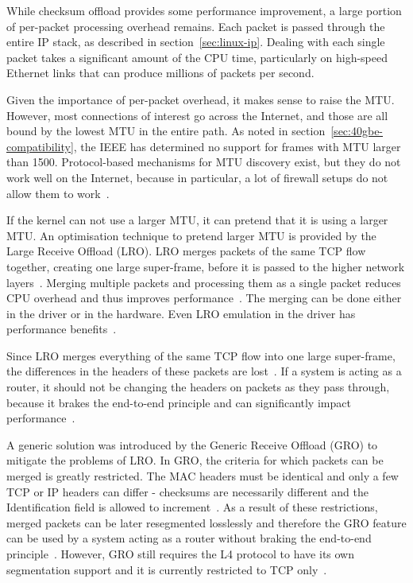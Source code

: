 While checksum offload provides some performance improvement,
a large portion of per-packet processing overhead remains.
Each packet is passed through the entire IP stack, as described in section~\ref{sec:linux-ip}.
Dealing with each single packet takes a significant amount of the CPU time, particularly on high-speed Ethernet links that
can produce millions of packets per second.

Given the importance of per-packet overhead, it makes sense to raise the MTU.
However, most connections of interest go across the Internet,
and those are all bound by the lowest MTU in the entire path.
As noted in section~\ref{sec:40gbe-compatibility}, the IEEE has determined no support for frames with MTU larger than 1500.
Protocol-based mechanisms for MTU discovery exist, but they do not work well on the Internet,
because in particular, a lot of firewall setups do not allow them to work~\cite{jls2009-gro}.

If the kernel can not use a larger MTU, it can pretend that it is using a larger MTU.
An optimisation technique to pretend larger MTU is provided by the Large Receive Offload (LRO).
LRO merges packets of the same TCP flow together,
creating one large super-frame, before it is passed to the higher network layers~\cite{jls2009-gro}.
Merging multiple packets and processing them as a single packet
reduces CPU overhead and thus improves performance~\cite{linux-kernel-networking}.
The merging can be done either in the driver or in the hardware.
Even LRO emulation in the driver has performance benefits~\cite{jls2009-gro}.

Since LRO merges everything of the same TCP flow into one large super-frame,
the differences in the headers of these packets are lost~\cite{jls2009-gro}.
If a system is acting as a router, it should not be changing the headers on packets as they pass through,
because it brakes the end-to-end principle and can significantly impact performance~\cite{linux-kernel-networking}.

A generic solution was introduced by the Generic Receive Offload (GRO) to mitigate the problems of LRO.
In GRO, the criteria for which packets can be merged is greatly restricted.
The MAC headers must be identical and only a few TCP or IP headers can differ -
checksums are necessarily different and the Identification field is allowed to increment~\cite{jls2009-gro}.
As a result of these restrictions, merged packets can be later resegmented losslessly
and therefore the GRO feature can be used by a system
acting as a router without braking the end-to-end principle~\cite{jls2009-gro}.
However, GRO still requires the L4 protocol to have its own segmentation support
and it is currently restricted to TCP only~\cite{linux-kernel-networking}.

